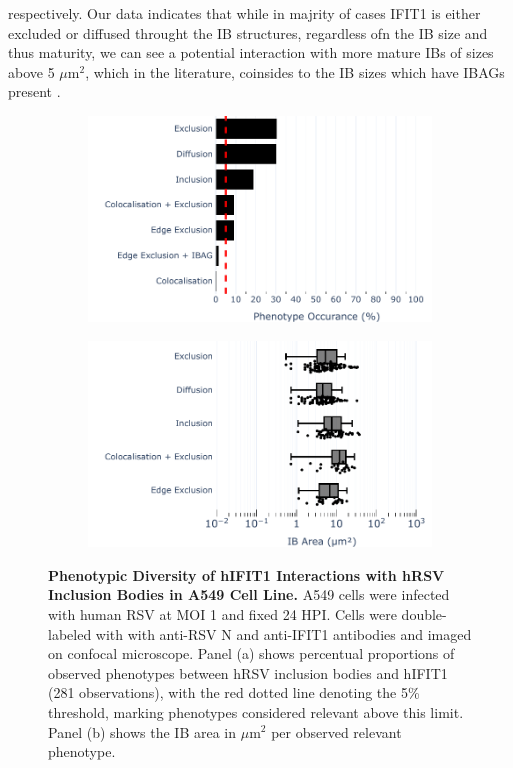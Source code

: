 respectively. Our data indicates that while in majrity of cases IFIT1 is either excluded or diffused throught the IB structures, regardless ofn the IB size and thus maturity, we can see a potential interaction with more mature IBs of sizes above 5 \(\mu \mbox{m}^2\), which in the literature, coinsides to the IB sizes which have IBAGs present \cite{Rincheval2017FunctionalVirus}. 

\begin{figure}
    \begin{subfigure}{0.495\textwidth}
        \caption{}
        \includegraphics[width=1\linewidth]{08. Chapter 3/Figs/02. Infection/01. IFIT1/01. bar_i1_a549.pdf} 
    \end{subfigure}
    \begin{subfigure}{0.495\textwidth}
        \caption{}
        \includegraphics[width=1\linewidth]{08. Chapter 3/Figs/02. Infection/01. IFIT1/02. box_i1_a549.pdf}
    \end{subfigure}
    \caption[Phenotypic Diversity of hIFIT1 Interactions with hRSV Inclusion Bodies in A549 Cell Line.]{\textbf{Phenotypic Diversity of hIFIT1 Interactions with hRSV Inclusion Bodies in A549 Cell Line.} A549 cells were infected with human RSV at MOI 1 and fixed 24 HPI. Cells were double-labeled with with anti-RSV N and anti-IFIT1 antibodies and imaged on confocal microscope. Panel (a) shows percentual proportions of observed phenotypes between hRSV inclusion bodies and hIFIT1 (281 observations), with the red dotted line denoting the 5\% threshold, marking phenotypes considered relevant above this limit. Panel (b) shows the IB area in \(\mu \mbox{m}^2\) per observed relevant phenotype.}

\end{figure}

